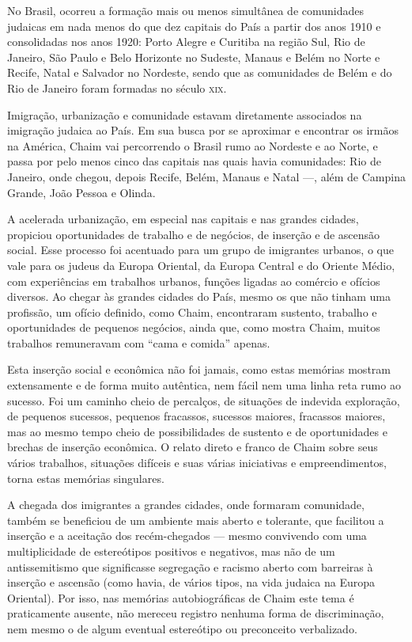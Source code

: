 No Brasil, ocorreu a formação mais ou menos simultânea de comunidades
judaicas em nada menos do que dez capitais do País a partir dos anos
1910 e consolidadas nos anos 1920: Porto Alegre e Curitiba na região
Sul, Rio de Janeiro, São Paulo e Belo Horizonte no Sudeste, Manaus e
Belém no Norte e Recife, Natal e Salvador no Nordeste, sendo que as
comunidades de Belém e do Rio de Janeiro foram formadas no século \textsc{xix}.

Imigração, urbanização e comunidade estavam diretamente associados na
imigração judaica ao País. Em sua busca por se aproximar e encontrar os
irmãos na América, Chaim vai percorrendo o Brasil rumo ao Nordeste e ao
Norte, e passa por pelo menos cinco das capitais nas quais havia
comunidades: Rio de Janeiro, onde chegou, depois Recife, Belém, Manaus e
Natal ---, além de Campina Grande, João Pessoa e Olinda.

A acelerada urbanização, em especial nas capitais e nas grandes cidades,
propiciou oportunidades de trabalho e de negócios, de inserção e de
ascensão social. Esse processo foi acentuado para um grupo de imigrantes
urbanos, o que vale para os judeus da Europa Oriental, da Europa Central
e do Oriente Médio, com experiências em trabalhos urbanos, funções
ligadas ao comércio e ofícios diversos. Ao chegar às grandes cidades do
País, mesmo os que não tinham uma profissão, um ofício definido, como
Chaim, encontraram sustento, trabalho e oportunidades de pequenos
negócios, ainda que, como mostra Chaim, muitos trabalhos remuneravam com
``cama e comida'' apenas.

Esta inserção social e econômica não foi jamais, como estas memórias
mostram extensamente e de forma muito autêntica, nem fácil nem uma linha
reta rumo ao sucesso. Foi um caminho cheio de percalços, de situações de
indevida exploração, de pequenos sucessos, pequenos fracassos, sucessos
maiores, fracassos maiores, mas ao mesmo tempo cheio de possibilidades
de sustento e de oportunidades e brechas de inserção econômica. O relato
direto e franco de Chaim sobre seus vários trabalhos, situações difíceis
e suas várias iniciativas e empreendimentos, torna estas memórias
singulares.

A chegada dos imigrantes a grandes cidades, onde formaram comunidade,
também se beneficiou de um ambiente mais aberto e tolerante, que
facilitou a inserção e a aceitação dos recém-chegados --- mesmo
convivendo com uma multiplicidade de estereótipos positivos e negativos,
mas não de um antissemitismo que significasse segregação e racismo
aberto com barreiras à inserção e ascensão (como havia, de vários tipos,
na vida judaica na Europa Oriental). Por isso, nas memórias
autobiográficas de Chaim este tema é praticamente ausente, não mereceu
registro nenhuma forma de discriminação, nem mesmo o de algum eventual
estereótipo ou preconceito verbalizado.

